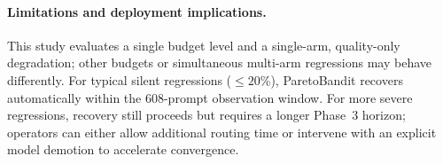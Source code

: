 \paragraph{Limitations and deployment implications.}
This study evaluates a single budget level and a single-arm,
quality-only degradation; other budgets or simultaneous multi-arm
regressions may behave differently.  For typical silent regressions
(${\leq}20$\%), ParetoBandit recovers automatically within the
608-prompt observation window.  For more severe regressions, recovery
still proceeds but requires a longer Phase~3 horizon; operators can
either allow additional routing time or intervene with an explicit
model demotion to accelerate convergence.
